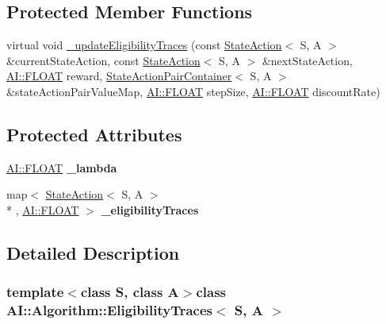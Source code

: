 \subsection*{Protected Member Functions}
\begin{DoxyCompactItemize}
\item 
virtual void \hyperlink{classAI_1_1Algorithm_1_1EligibilityTraces_a354115a368dc58abcdbc9285ec2537df}{\-\_\-update\-Eligibility\-Traces} (const \hyperlink{classAI_1_1StateAction}{State\-Action}$<$ S, A $>$ \&current\-State\-Action, const \hyperlink{classAI_1_1StateAction}{State\-Action}$<$ S, A $>$ \&next\-State\-Action, \hyperlink{namespaceAI_a41b74884a20833db653dded3918e05c3}{A\-I\-::\-F\-L\-O\-A\-T} reward, \hyperlink{classAI_1_1StateActionPairContainer}{State\-Action\-Pair\-Container}$<$ S, A $>$ \&state\-Action\-Pair\-Value\-Map, \hyperlink{namespaceAI_a41b74884a20833db653dded3918e05c3}{A\-I\-::\-F\-L\-O\-A\-T} step\-Size, \hyperlink{namespaceAI_a41b74884a20833db653dded3918e05c3}{A\-I\-::\-F\-L\-O\-A\-T} discount\-Rate)
\end{DoxyCompactItemize}
\subsection*{Protected Attributes}
\begin{DoxyCompactItemize}
\item 
\hypertarget{classAI_1_1Algorithm_1_1EligibilityTraces_a5c7e8c5c912cd0402cd4d60fb7c34da3}{\hyperlink{namespaceAI_a41b74884a20833db653dded3918e05c3}{A\-I\-::\-F\-L\-O\-A\-T} {\bfseries \-\_\-lambda}}\label{classAI_1_1Algorithm_1_1EligibilityTraces_a5c7e8c5c912cd0402cd4d60fb7c34da3}

\item 
\hypertarget{classAI_1_1Algorithm_1_1EligibilityTraces_aa4a94928533e63cb6b263f7abfde4e53}{map$<$ \hyperlink{classAI_1_1StateAction}{State\-Action}$<$ S, A $>$\\*
, \hyperlink{namespaceAI_a41b74884a20833db653dded3918e05c3}{A\-I\-::\-F\-L\-O\-A\-T} $>$ {\bfseries \-\_\-eligibility\-Traces}}\label{classAI_1_1Algorithm_1_1EligibilityTraces_aa4a94928533e63cb6b263f7abfde4e53}

\end{DoxyCompactItemize}


\subsection{Detailed Description}
\subsubsection*{template$<$class S, class A$>$class A\-I\-::\-Algorithm\-::\-Eligibility\-Traces$<$ S, A $>$}

